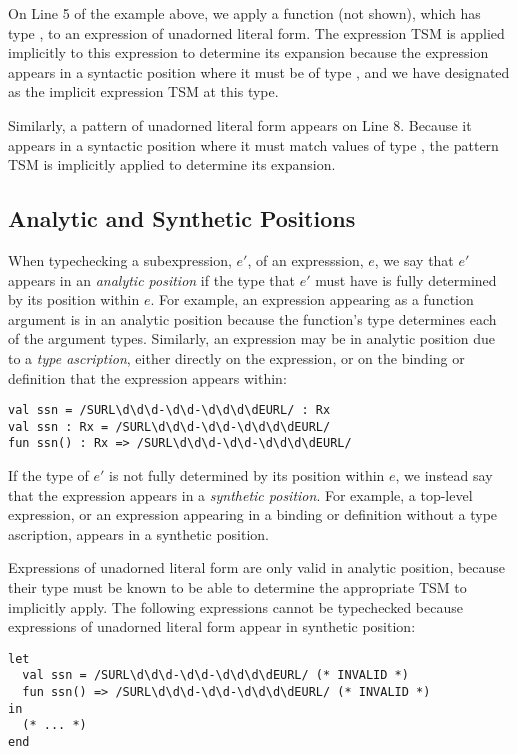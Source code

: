 On Line 5 of the example above, we apply a function  (not shown), which has type , to an expression of unadorned literal form. The expression TSM  is applied implicitly to this expression to determine its expansion because the expression appears in a syntactic position where it must be of type , and we have designated  as the implicit expression TSM at this type. %

Similarly, a pattern of unadorned literal form appears on Line 8. Because it appears in a syntactic position where it must match values of type , the pattern TSM  is implicitly applied to determine its expansion.

\subsection{Analytic and Synthetic Positions}
When typechecking a subexpression, $e'$, of an expresssion, $e$, we say that $e'$ appears in an \emph{analytic position} if the type that $e'$ must have is fully determined by its position within $e$. For example, an expression appearing as a function argument is in an analytic position because the function's type determines each of the argument types. Similarly, an expression may be in analytic position due to a \emph{type ascription}, either directly on the expression, or on the binding or definition that the expression appears within:
\begin{lstlisting}[numbers=none]
val ssn = /SURL\d\d\d-\d\d-\d\d\d\dEURL/ : Rx
val ssn : Rx = /SURL\d\d\d-\d\d-\d\d\d\dEURL/
fun ssn() : Rx => /SURL\d\d\d-\d\d-\d\d\d\dEURL/
\end{lstlisting}

If the type of $e'$ is not fully determined by its position within $e$, we instead say that the expression appears in a \emph{synthetic position}. For example, a top-level expression, or an expression appearing in a binding or definition without a type ascription, appears in a synthetic position.

Expressions of unadorned literal form are only valid in analytic position, because their type must be known to be able to determine the appropriate TSM to implicitly apply. The following expressions cannot be typechecked because expressions of unadorned literal form appear in synthetic position:
\begin{lstlisting}[numbers=none]
let 
  val ssn = /SURL\d\d\d-\d\d-\d\d\d\dEURL/ (* INVALID *)
  fun ssn() => /SURL\d\d\d-\d\d-\d\d\d\dEURL/ (* INVALID *)
in 
  (* ... *) 
end
\end{lstlisting}

